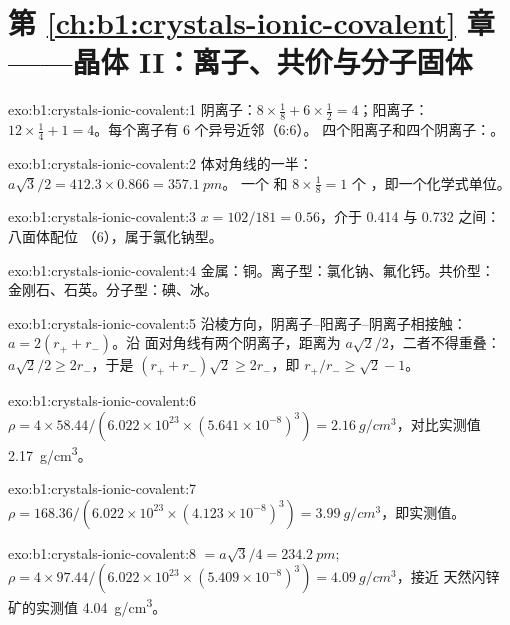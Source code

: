 \section*{第 \ref{ch:b1:crystals-ionic-covalent} 章——晶体 II：离子、共价与分子固体}

\begin{solution}{exo:b1:crystals-ionic-covalent:1}
阴离子：$8 \times \frac18 + 6 \times \frac12 = 4$；阳离子：$12 \times
\frac14 + 1 = 4$。每个离子有 6 个异号近邻（6:6）。
四个阳离子和四个阴离子：。
\end{solution}

\begin{solution}{exo:b1:crystals-ionic-covalent:2}
体对角线的一半：$a\sqrt3/2 = 412.3 \times 0.866 = \qty{357.1}{pm}$。
一个  和 $8 \times \frac18 = 1$ 个 ，即一个化学式单位。
\end{solution}

\begin{solution}{exo:b1:crystals-ionic-covalent:3}
$x = 102/181 = 0.56$，介于 0.414 与 0.732 之间：八面体配位
（6），属于氯化钠型。
\end{solution}

\begin{solution}{exo:b1:crystals-ionic-covalent:4}
金属：铜。离子型：氯化钠、氟化钙。共价型：
金刚石、石英。分子型：碘、冰。
\end{solution}

\begin{solution}{exo:b1:crystals-ionic-covalent:5}
沿棱方向，阴离子–阳离子–阴离子相接触：$a = 2(r_+ + r_-)$。沿
面对角线有两个阴离子，距离为 $a\sqrt2/2$，二者不得重叠：
$a\sqrt2/2 \ge 2r_-$，于是 $(r_+ + r_-)\sqrt2 \ge 2r_-$，即
$r_+/r_- \ge \sqrt2 - 1$。
\end{solution}

\begin{solution}{exo:b1:crystals-ionic-covalent:6}
$\rho = 4 \times 58.44/(6.022 \times 10^{23} \times (5.641 \times
10^{-8})^3) = \qty{2.16}{g/cm^3}$，对比实测值 \qty{2.17}{g/cm^3}。
\end{solution}

\begin{solution}{exo:b1:crystals-ionic-covalent:7}
$\rho = 168.36/(6.022 \times 10^{23} \times (4.123 \times 10^{-8})^3) =
\qty{3.99}{g/cm^3}$，即实测值。
\end{solution}

\begin{solution}{exo:b1:crystals-ionic-covalent:8}
 $= a\sqrt3/4 = \qty{234.2}{pm}$;
$\rho = 4 \times 97.44/(6.022 \times 10^{23} \times (5.409 \times
10^{-8})^3) = \qty{4.09}{g/cm^3}$，接近
天然闪锌矿的实测值 \qty{4.04}{g/cm^3}。
\end{solution}

